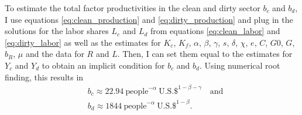 To estimate the total factor productivities in the clean and dirty sector $b_c$ and $b_d$, I use equations \ref{eq:clean_production} and \ref{eq:dirty_production} and plug in the solutions for the labor shares $L_c$ and $L_d$ from equations \ref{eq:clean_labor} and \ref{eq:dirty_labor} as well as the estimates for $K_c$, $K_f$, $\alpha$, $\beta$, $\gamma$, $s$, $\delta$, $\chi$, $e$, $C$, $G0$, $G$, $b_R$, $\mu$ and the data for $R$ and $L$. Then, I can set them equal to the estimates for $Y_c$ and $Y_d$ to obtain an implicit condition for $b_c$ and $b_d$. Using numerical root finding, this results in 
 \begin{align}
  &b_c \approx 22.94 ~ \mathrm{people} ^{-\alpha} ~ \mathrm{U.S. \$}^{1-\beta-\gamma} \quad \mathrm{and} \\
  &b_d \approx 1844 ~ \mathrm{people}^{-\alpha} ~ \mathrm{U.S. \$}^{1-\beta}.
  \label{eq:estimate_total_factor_productivities}
\end{align}


